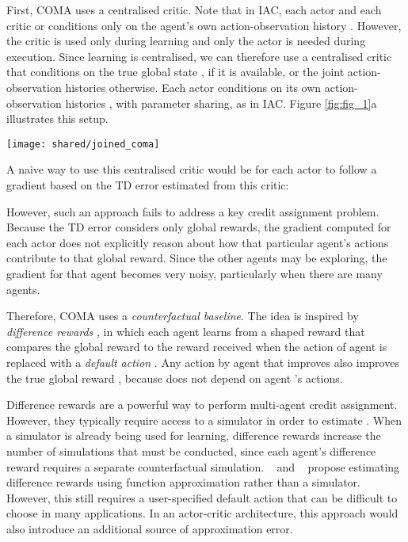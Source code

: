 \documentclass[letterpaper]{article}
\newcommand{\citet}[1]{\citeauthor{#1}~\shortcite{#1}}
\newcommand{\citep}{\cite}
\begin{document}
First, COMA uses a centralised critic.  Note that in IAC, each actor   and each critic  or  conditions only on the agent's own action-observation history .  However, the critic is used only during learning and only the actor is needed during execution.  Since learning is centralised, we can therefore use a centralised critic that conditions on the true global state , if it is available, or the joint action-observation histories  otherwise. Each actor conditions on its own action-observation histories , with parameter sharing, as in IAC.  Figure \ref{fig:fig_1}a illustrates this setup.

\begin{figure*}[ht]
\centering
	\texttt{[image: shared/joined\_coma]}
\caption{In (a), information flow between the decentralised actors, the environment and the centralised critic in COMA; red arrows and components are only required during centralised learning. In (b) and (c), architectures of the actor and critic. 
}
\label{fig:fig_1}
\end{figure*}

A naive way to use this centralised critic would be for each actor to follow a 
gradient based on the TD error estimated from this critic:



 However, such an approach fails to address a key credit assignment problem.  
 Because the TD error considers only global rewards, the gradient computed for 
 each actor does not explicitly reason about how that particular agent's 
 actions contribute to that global reward.  Since the other agents may be 
 exploring, the gradient for that agent becomes very noisy, particularly when 
 there are many agents.

Therefore, COMA uses a \emph{counterfactual baseline}.  The idea is inspired by 
\emph{difference rewards} \citep{wolpert2002optimal}, in which each agent 
learns from a shaped reward  that 
compares the global reward to the reward received when the action of agent  
is replaced with a \emph{default action} . Any action by agent  that 
improves  also improves the true global reward , because  does not depend on agent 's actions.

Difference rewards are a powerful way to perform multi-agent credit 
assignment.  However, they typically require access to a simulator in order to 
estimate .  When a simulator is already being used for 
learning, difference rewards increase the number of simulations that must be 
conducted, since each agent's difference reward requires a separate 
counterfactual simulation. \citet{proper2012modeling} and 
\citet{colby2015approximating} 
propose estimating difference rewards using function approximation rather than a 
simulator. However, this still requires a 
user-specified default action  that can be difficult to choose in many 
applications. In an actor-critic architecture, this approach would also
introduce an additional source of approximation error.
\end{document}
